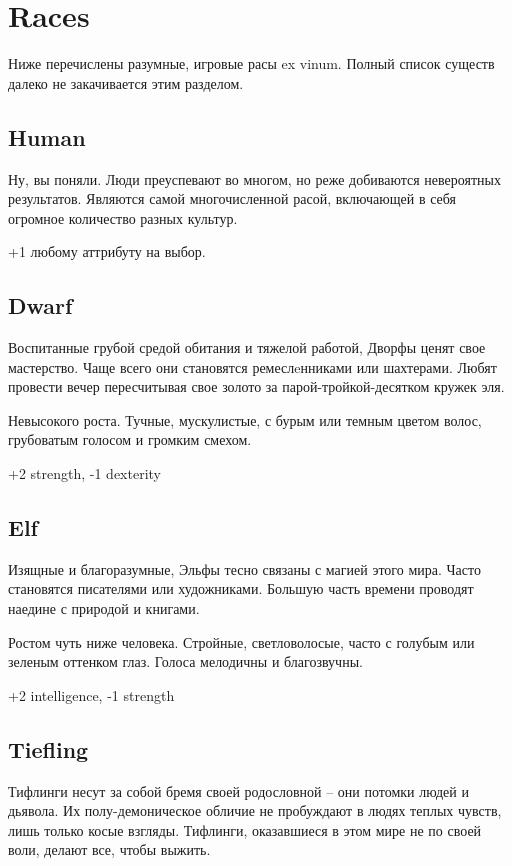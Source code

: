 \documentclass[a4paper,12pt,twocolumn]{book}
\begin{document}
\chapter{Races}
\lettrine{Н}{}иже перечислены разумные, игровые расы ex vinum. Полный список существ далеко не закачивается этим разделом.

\section{Human}
Ну, вы поняли. Люди преуспевают во многом, но реже добиваются невероятных результатов. Являются самой многочисленной расой, включающей в себя огромное количество разных культур.

\smallskip
+1 любому аттрибуту на выбор.

\section{Dwarf}

Воспитанные грубой средой обитания и тяжелой работой, Дворфы ценят свое мастерство. Чаще всего они становятся ремеслeнниками или шахтерами. Любят провести вечер пересчитывая свое золото за парой-тройкой-десятком кружек эля.

Невысокого роста. Тучные, мускулистые, с бурым или темным цветом волос, грубоватым голосом и громким смехом.

\smallskip
+2 strength, -1 dexterity

\section{Elf}

Изящные и благоразумные, Эльфы тесно связаны с магией этого мира. Часто становятся писателями или художниками. Большую часть времени проводят наедине с природой и книгами.

Ростом чуть ниже человека. Стройные, светловолосые, часто с голубым или зеленым оттенком глаз. Голоса мелодичны и благозвучны.

\smallskip
+2 intelligence, -1 strength

\section{Tiefling}

Тифлинги несут за собой бремя своей родословной -- они потомки людей и дьявола. Их полу-демоническое обличие не пробуждают в людях теплых чувств, лишь только косые взгляды. Тифлинги, оказавшиеся в этом мире не по своей воли, делают все, чтобы выжить.
\end{document}
